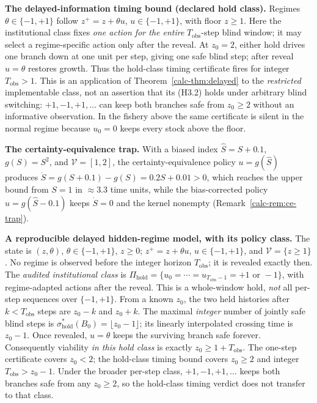 \documentclass[10pt,twocolumn]{article}
\theoremstyle{definition}
\begin{document}
\textbf{The delayed-information timing bound (declared hold class).}
Regimes \(\theta\in\{-1,+1\}\) follow \(z^{+}=z+\theta u\),
\(u\in\{-1,+1\}\), with floor \(z\ge1\). Here the institutional
class fixes \emph{one action for the entire} \(T_{\mathrm{obs}}\)-step
blind window; it may select a regime-specific action only after the
reveal. At \(z_0=2\), either hold drives one branch down at one unit
per step, giving one safe blind step; after reveal \(u=\theta\)
restores growth. Thus the hold-class timing certificate fires for
integer \(T_{\mathrm{obs}}>1\). This is an application of
Theorem~\ref{calc-thm:delayed} to the \emph{restricted} implementable
class, not an assertion that its (H3.2) holds under arbitrary blind
switching: \(+1,-1,+1,\ldots\) can keep both branches safe from
\(z_0\ge2\) without an informative observation. In the fishery above
the same certificate is silent in the normal regime because \(u_0=0\)
keeps every stock above the floor.

\textbf{The certainty-equivalence trap.} With a biased index \(\hat{S} = S + 0.1\), \(g(S) = S^{2}\), and \(\mathcal{V} = [1,2]\), the certainty-equivalence policy \(u = g(\hat{S})\) produces \(\dot{S} = g(S+0.1) - g(S) = 0.2S + 0.01 > 0\), which reaches the upper bound from \(S = 1\) in \(\approx 3.3\) time units, while the bias-corrected policy \(u = g(\hat{S} - 0.1)\) keeps \(\dot{S} = 0\) and the kernel nonempty (Remark~\ref{calc-rem:ce-trap}).

\textbf{A reproducible delayed hidden-regime model, with its policy class.}
The state is \((z,\theta)\), \(\theta\in\{-1,+1\}\), \(z\ge0\);
\(z^{+}=z+\theta u\), \(u\in\{-1,+1\}\), and
\(\mathcal V=\{z\ge1\}\). No regime is observed before the integer
horizon \(T_{\mathrm{obs}}\); it is revealed exactly then. The \emph{audited
institutional class} is
\(\Pi_{\mathrm{hold}}=\{u_0=\cdots=u_{T_{\mathrm{obs}}-1}
=+1\text{ or }-1\}\), with regime-adapted actions after the reveal.
This is a whole-window hold, \emph{not} all per-step sequences over
\(\{-1,+1\}\). From a known \(z_0\), the two held histories after
\(k<T_{\mathrm{obs}}\) steps are \(z_0-k\) and \(z_0+k\).
The maximal \emph{integer} number of jointly safe blind steps is
\(\sigma^*_{\mathrm{hold}}(B_0)=\lfloor z_0-1\rfloor\); its linearly
interpolated crossing time is \(z_0-1\). Once revealed, \(u=\theta\)
keeps the surviving branch safe forever. Consequently viability
\emph{in this hold class} is exactly \(z_0\ge1+T_{\mathrm{obs}}\).
The one-step certificate covers \(z_0<2\); the hold-class timing
bound covers \(z_0\ge2\) and integer
\(T_{\mathrm{obs}}>z_0-1\). Under the broader per-step class,
\(+1,-1,+1,\ldots\) keeps both branches safe from any \(z_0\ge2\),
so the hold-class timing verdict does not transfer to that class.
\end{document}
